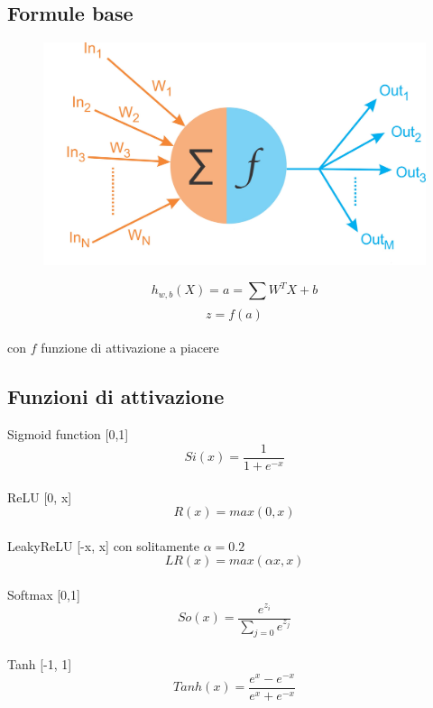 \documentclass[]{article}
\begin{document}
\subsection{Formule base}
\begin{figure}[h] 
\centering 
\includegraphics[scale=0.2]{dl} 
\end{figure}

\[h_{w,b}(X) = a = \sum_{} W^T X + b\]
\[ z = f(a)\] \\
con $f$ funzione di attivazione a piacere


\subsection{Funzioni di attivazione}

Sigmoid function [0,1]\\
\[ Si(x) = \frac{1}{1+e^{-x}} \] \\

ReLU [0, x] \\ 
\[R(x) = max(0, x)\] \\

LeakyReLU [-x, x] con solitamente $\alpha = 0.2$ \\
\[ LR(x) = max(\alpha x, x)\]  \\

Softmax [0,1]  
\[ So(x) = \frac{e^{z_i}}{\sum_{j=0}e^{z_j}} \] \\

Tanh [-1, 1] \\
\[ Tanh(x) = \frac{e^{x} - e^{-x}}{e^{x} + e^{-x}}\]\\

\end{document}
